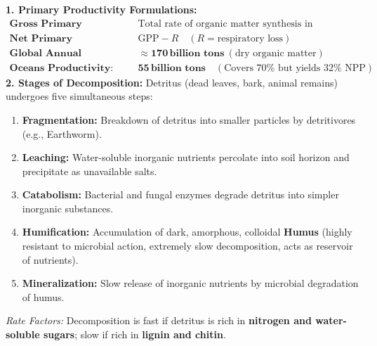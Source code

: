 \documentclass[10pt,a4paper]{article}
\begin{document}
\begin{formulabox}
\textbf{1. Primary Productivity Formulations:}
\begin{align*}
  \textbf{Gross Primary Productivity (GPP): } & \text{Total rate of organic matter synthesis in photosynthesis.}\\
  \textbf{Net Primary Productivity (NPP): } & \mathrm{GPP} - R \quad (R = \text{respiratory loss})\\
  \textbf{Global Annual Biosphere NPP: } & \approx \mathbf{170\,\text{billion tons}} \ (\text{dry organic matter})\\
  \textbf{Oceans Productivity: } & \mathbf{55\,\text{billion tons}} \quad (\text{Covers } 70\% \text{ but yields } 32\% \text{ NPP})
\end{align*}
\textbf{2. Stages of Decomposition:}
Detritus (dead leaves, bark, animal remains) undergoes five simultaneous steps:
\begin{enumerate}
  \item \textbf{Fragmentation:} Breakdown of detritus into smaller particles by detritivores (e.g., Earthworm).
  \item \textbf{Leaching:} Water-soluble inorganic nutrients percolate into soil horizon and precipitate as unavailable salts.
  \item \textbf{Catabolism:} Bacterial and fungal enzymes degrade detritus into simpler inorganic substances.
  \item \textbf{Humification:} Accumulation of dark, amorphous, colloidal \textbf{Humus} (highly resistant to microbial action, extremely slow decomposition, acts as reservoir of nutrients).
  \item \textbf{Mineralization:} Slow release of inorganic nutrients by microbial degradation of humus.
\end{enumerate}
\textit{Rate Factors:} Decomposition is fast if detritus is rich in \textbf{nitrogen and water-soluble sugars}; slow if rich in \textbf{lignin and chitin}.
\end{formulabox}
\end{document}

